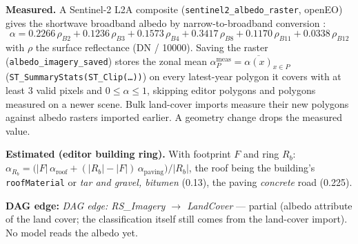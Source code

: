 \documentclass[11pt]{article}
\newcommand{\code}[1]{\texttt{#1}}
\newcommand{\dagedge}[1]{\textit{DAG edge: #1}}
\newcommand{\statuspartial}{\textcolor{orange!80!black}{partial}}
\begin{document}
\textbf{Measured.} A Sentinel-2 L2A composite (\code{sentinel2\_albedo\_raster}, openEO) gives the shortwave broadband albedo by narrow-to-broadband conversion \cite{Bonafoni2020}:
\begin{equation}
  \alpha = 0.2266\,\rho_{B2} + 0.1236\,\rho_{B3} + 0.1573\,\rho_{B4} + 0.3417\,\rho_{B8} + 0.1170\,\rho_{B11} + 0.0338\,\rho_{B12}
\end{equation}
with $\rho$ the surface reflectance (DN / \num{10000}). Saving the raster (\code{albedo\_imagery\_saved}) stores the zonal mean $\alpha_P^{\text{meas}} = \overline{\alpha(x)}_{x \in P}$ (\code{ST\_SummaryStats(ST\_Clip(\ldots))}) on every latest-year polygon it covers with at least 3 valid pixels and $0 \le \alpha \le 1$, skipping editor polygons and polygons measured on a newer scene. Bulk land-cover imports measure their new polygons against albedo rasters imported earlier. A geometry change drops the measured value.

\textbf{Estimated (editor building ring).} With footprint $F$ and ring $R_b$: $\alpha_{R_b} = \big(|F|\,\alpha_{\text{roof}} + (|R_b| - |F|)\,\alpha_{\text{paving}}\big) / |R_b|$, the roof being the building's \code{roofMaterial} or \emph{tar and gravel, bitumen} (0.13), the paving \emph{concrete} road (0.225).

\textbf{DAG edge:} \dagedge{RS\_Imagery $\rightarrow$ LandCover} --- \statuspartial{} (albedo attribute of the land cover; the classification itself still comes from the land-cover import). No model reads the albedo yet.
\end{document}
